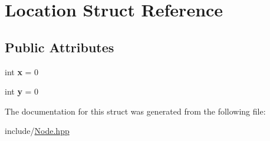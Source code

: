 \hypertarget{structLocation}{}\section{Location Struct Reference}
\label{structLocation}
\subsection*{Public Attributes}
\begin{DoxyCompactItemize}
\item 
int {\bfseries x} = 0\hypertarget{structLocation_aea76eebc474e30c04c53e5f03c6749e3}{}\label{structLocation_aea76eebc474e30c04c53e5f03c6749e3}

\item 
int {\bfseries y} = 0\hypertarget{structLocation_a307809776b981810147af56d9304e273}{}\label{structLocation_a307809776b981810147af56d9304e273}

\end{DoxyCompactItemize}


The documentation for this struct was generated from the following file\+:\begin{DoxyCompactItemize}
\item 
include/\hyperlink{Node_8hpp}{Node.\+hpp}\end{DoxyCompactItemize}
